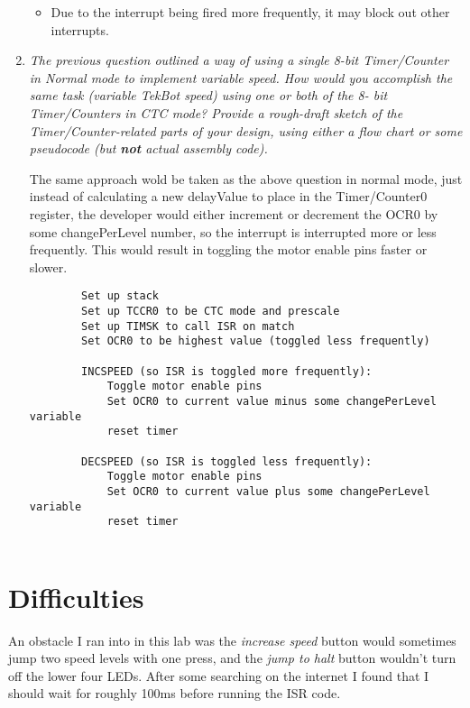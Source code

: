 \documentclass[12pt,letterpaper]{article}
\begin{document}
\begin{enumerate}
\begin{itemize}
	  	\item
	  	Due to the interrupt being fired more frequently, it may block out other interrupts.
	  	
	  \end{itemize}
	  
	  
	  
	  \item
	  \textit{The previous question outlined a way of using a single 8-bit Timer/Counter in Normal mode to implement variable speed. 
	  How would you accomplish the same task (variable TekBot speed) using one or both of the 8-
	  bit Timer/Counters in CTC mode? 
	  Provide a rough-draft sketch of the Timer/Counter-related parts of your design, using either a flow chart or some pseudocode (but \textbf{not} actual assembly code).}
	  
	  The same approach wold be taken as the above question in normal mode, just instead of calculating a new delayValue to place in the Timer/Counter0 register, the developer would either increment or decrement the OCR0 by some changePerLevel number, so the interrupt is interrupted more or less frequently.
	  This would result in toggling the motor enable pins faster or slower.
	  
	  \begin{verbatim}
	  	Set up stack
	  	Set up TCCR0 to be CTC mode and prescale
	  	Set up TIMSK to call ISR on match
	  	Set OCR0 to be highest value (toggled less frequently)
	  	
	  	INCSPEED (so ISR is toggled more frequently):
	  		Toggle motor enable pins
	  		Set OCR0 to current value minus some changePerLevel variable
	  		reset timer
	  		
	  	DECSPEED (so ISR is toggled less frequently):
	  		Toggle motor enable pins
	  		Set OCR0 to current value plus some changePerLevel variable 
	  		reset timer
	  	
	  \end{verbatim}
	  
	\end{enumerate}

\section{Difficulties}
	An obstacle I ran into in this lab was the \textit{increase speed} button would sometimes jump two speed levels with one press, and the \textit{jump to halt} button wouldn't turn off the lower four LEDs.
	After some searching on the internet I found that I should wait for roughly 100ms before running the ISR code.
	 
\end{document}
